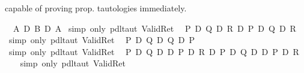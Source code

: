 \begin{isabellebody}
\begin{isamarkuptext}
         capable of proving prop. tautologies immediately.%
\end{isamarkuptext}%
\isamarkuptrue%
\ {\isachardoublequote}{\isasymturnstile}\ A\ {\isasymlongrightarrow}\isactrlsub D\ B\ {\isasymlongrightarrow}\isactrlsub D\ A{\isachardoublequote}\isanewline
\isamarkupfalse%
\ {\isacharparenleft}simp\ only{\isacharcolon}\ pdl{\isacharunderscore}taut\ Valid{\isacharunderscore}Ret{\isacharparenright}\isanewline
\isanewline
\isanewline
\isamarkupfalse%
\ {\isachardoublequote}{\isasymturnstile}\ {\isacharparenleft}P\ {\isasymand}\isactrlsub D\ Q\ {\isasymlongrightarrow}\isactrlsub D\ R{\isacharparenright}\ {\isasymlongleftrightarrow}\isactrlsub D\ {\isacharparenleft}P\ {\isasymlongrightarrow}\isactrlsub D\ Q\ {\isasymlongrightarrow}\isactrlsub D\ R{\isacharparenright}{\isachardoublequote}\isanewline
\isamarkupfalse%
\ {\isacharparenleft}simp\ only{\isacharcolon}\ pdl{\isacharunderscore}taut\ Valid{\isacharunderscore}Ret{\isacharparenright}\isanewline
\isanewline
\isanewline
\isamarkupfalse%
\ {\isachardoublequote}{\isasymturnstile}\ {\isacharparenleft}P\ {\isasymlongrightarrow}\isactrlsub D\ Q{\isacharparenright}\ {\isasymor}\isactrlsub D\ {\isacharparenleft}Q\ {\isasymlongrightarrow}\isactrlsub D\ P{\isacharparenright}{\isachardoublequote}\isanewline
\ \ \isamarkupfalse%
\ {\isacharparenleft}simp\ only{\isacharcolon}\ pdl{\isacharunderscore}taut\ Valid{\isacharunderscore}Ret{\isacharparenright}\isanewline
\isanewline
\isanewline
\isamarkupfalse%
\ {\isachardoublequote}{\isasymturnstile}\ {\isacharparenleft}P\ {\isasymlongrightarrow}\isactrlsub D\ Q{\isacharparenright}\ {\isasymand}\isactrlsub D\ {\isacharparenleft}{\isasymnot}\isactrlsub D\ P\ {\isasymlongrightarrow}\isactrlsub D\ R{\isacharparenright}\ {\isasymlongleftrightarrow}\isactrlsub D\ {\isacharparenleft}P\ {\isasymand}\isactrlsub D\ Q\ {\isasymor}\isactrlsub D\ {\isasymnot}\isactrlsub D\ P\ {\isasymand}\isactrlsub D\ R{\isacharparenright}{\isachardoublequote}\isanewline
\ \ \isamarkupfalse%
\ {\isacharparenleft}simp\ only{\isacharcolon}\ pdl{\isacharunderscore}taut\ Valid{\isacharunderscore}Ret{\isacharparenright}\isanewline
\isanewline
\isamarkupfalse%
\isanewline
\isamarkupfalse%
\end{isabellebody}%
